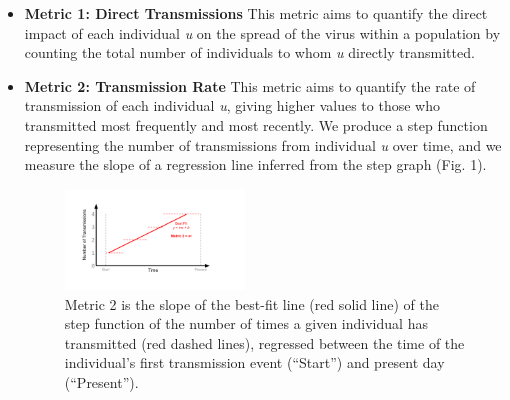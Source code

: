 \documentclass[twocolumn]{bmcart}%
\begin{document}
\begin{itemize}
\item \textbf{Metric 1: Direct Transmissions} This metric aims to quantify the direct impact of each individual \textit{u} on the spread of the virus within a population by counting the total number of individuals to whom \textit{u} directly transmitted.\\

\item \textbf{Metric 2: Transmission Rate} This metric aims to quantify the rate of transmission of each individual \textit{u}, giving higher values to those who transmitted
most frequently and 
most recently.
We produce a step function representing the number of transmissions from individual \textit{u} over time,
and we measure the slope of a regression line inferred from the step graph (Fig. 1).\\

\begin{figure}[h!]
\centering
\includegraphics[width=0.45\textwidth]{Fig1.pdf}
\caption{Metric 2 is the slope of the best-fit line (red solid line) of the step function of the number of times a given individual has transmitted (red dashed lines), regressed between the time of the individual's first transmission event (``Start'') and present day (``Present'').
}
\end{figure}


\end{itemize}
\end{document}
